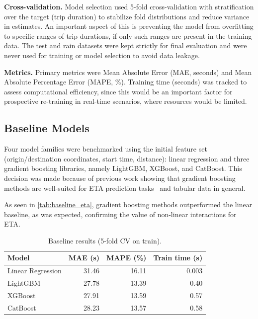 \textbf{Cross-validation.} Model selection used 5-fold cross-validation with stratification over the target (trip duration) to stabilize fold distributions and reduce variance in estimates.
An important aspect of this is preventing the model from overfitting to specific ranges of trip durations, if only such ranges are present in the training data.
The test and rain datasets were kept strictly for final evaluation and were never used for training or model selection to avoid data leakage.

\textbf{Metrics.} Primary metrics were Mean Absolute Error (MAE, seconds) and Mean Absolute Percentage Error (MAPE, \%).
Training time (seconds) was tracked to assess computational efficiency, since this would be an important factor for prospective re-training in real-time scenarios, where resources would be limited.

\subsection{Baseline Models}
Four model families were benchmarked using the initial feature set (origin/destination coordinates, start time, distance): linear regression and three gradient boosting libraries, namely LightGBM, XGBoost, and CatBoost.
This decision was made because of previous work showing that gradient boosting methods are well-suited for ETA prediction tasks~\cite{antypas2022etagb} and tabular data in general.

As seen in \autoref{tab:baseline_eta}, gradient boosting methods outperformed the linear baseline, as was expected, confirming the value of non-linear interactions for ETA.

\begin{table}[htbp]
    \centering
    \caption{Baseline results (5-fold CV on train).}
    \label{tab:baseline_eta}
    \begin{tabular}{lrrr}
        \toprule
        \textbf{Model} & \textbf{MAE (s)} & \textbf{MAPE (\%)} & \textbf{Train time (s)} \\
        \midrule
        Linear Regression & 31.46 & 16.11 & 0.003 \\
        LightGBM & 27.78 & 13.39 & 0.40 \\
        XGBoost & 27.91 & 13.59 & 0.57 \\
        CatBoost & 28.23 & 13.57 & 0.58 \\
        \bottomrule
    \end{tabular}
\end{table}

